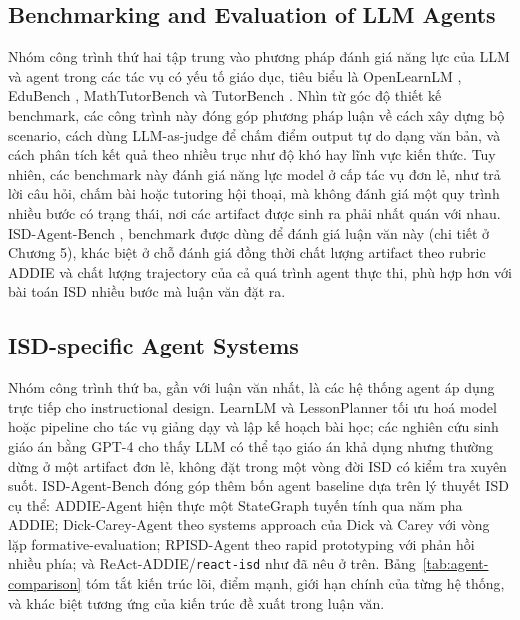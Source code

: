 \documentclass[../main.tex]{subfiles}
\begin{document}
\subsection{Benchmarking and Evaluation of LLM Agents}

Nhóm công trình thứ hai tập trung vào phương pháp đánh giá năng lực của LLM và agent trong các tác vụ có yếu tố giáo dục, tiêu biểu là OpenLearnLM \cite{openlearnlm2026}, EduBench \cite{edubench2025}, MathTutorBench \cite{mathtutorbench2025} và TutorBench \cite{tutorbench2025}. Nhìn từ góc độ thiết kế benchmark, các công trình này đóng góp phương pháp luận về cách xây dựng bộ scenario, cách dùng LLM-as-judge để chấm điểm output tự do dạng văn bản, và cách phân tích kết quả theo nhiều trục như độ khó hay lĩnh vực kiến thức. Tuy nhiên, các benchmark này đánh giá năng lực model ở cấp tác vụ đơn lẻ, như trả lời câu hỏi, chấm bài hoặc tutoring hội thoại, mà không đánh giá một quy trình nhiều bước có trạng thái, nơi các artifact được sinh ra phải nhất quán với nhau. ISD-Agent-Bench \cite{isdagentbench}, benchmark được dùng để đánh giá luận văn này (chi tiết ở Chương 5), khác biệt ở chỗ đánh giá đồng thời chất lượng artifact theo rubric ADDIE và chất lượng trajectory của cả quá trình agent thực thi, phù hợp hơn với bài toán ISD nhiều bước mà luận văn đặt ra.

\subsection{ISD-specific Agent Systems}

Nhóm công trình thứ ba, gần với luận văn nhất, là các hệ thống agent áp dụng trực tiếp cho instructional design. LearnLM \cite{learnlm2024} và LessonPlanner \cite{lessonplanner2024} tối ưu hoá model hoặc pipeline cho tác vụ giảng dạy và lập kế hoạch bài học; các nghiên cứu sinh giáo án bằng GPT-4 \cite{hu2024teachingplan} cho thấy LLM có thể tạo giáo án khả dụng nhưng thường dừng ở một artifact đơn lẻ, không đặt trong một vòng đời ISD có kiểm tra xuyên suốt. ISD-Agent-Bench đóng góp thêm bốn agent baseline dựa trên lý thuyết ISD cụ thể: ADDIE-Agent \cite{isdagentbench,branch2009addie} hiện thực một StateGraph tuyến tính qua năm pha ADDIE; Dick-Carey-Agent \cite{isdagentbench,dick1978systematic} theo systems approach của Dick và Carey với vòng lặp formative-evaluation; RPISD-Agent \cite{isdagentbench,tripp1990rapid} theo rapid prototyping với phản hồi nhiều phía; và ReAct-ADDIE/\texttt{react-isd} \cite{isdagentbench,yao2023react} như đã nêu ở trên. Bảng~\ref{tab:agent-comparison} tóm tắt kiến trúc lõi, điểm mạnh, giới hạn chính của từng hệ thống, và khác biệt tương ứng của kiến trúc đề xuất trong luận văn.
\end{document}
